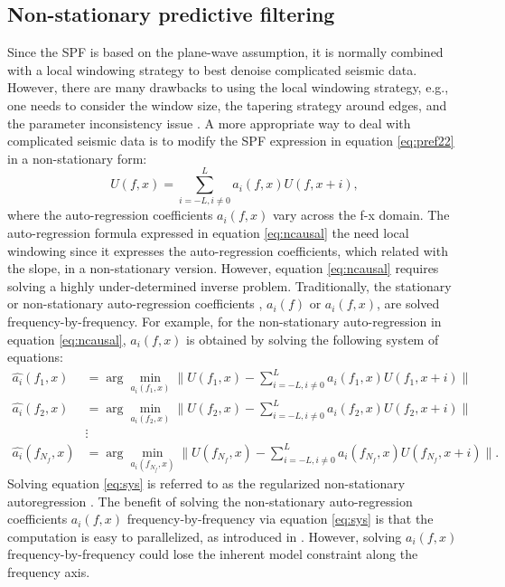 \subsection{Non-stationary predictive filtering}
Since the SPF is based on the plane-wave assumption, it is normally combined with a local windowing strategy to best denoise complicated seismic data. However, there are many drawbacks to using the local windowing strategy, e.g., one needs to consider the window size, the tapering strategy around edges, and the parameter inconsistency issue \cite[]{shaohuan2017gji}. A more appropriate way to deal with complicated seismic data is to modify the SPF expression in equation \ref{eq:pref22} in a non-stationary form:
\begin{equation}
\label{eq:ncausal}
U(f,x)=\sum_{i=-L,i\ne 0}^{L}a_i(f,x)U(f,x+i),
\end{equation}
where the auto-regression coefficients $a_i(f,x)$ vary across the f-x domain. The auto-regression formula expressed in equation \ref{eq:ncausal}  the need  local windowing since it expresses the auto-regression coefficients, which  related with the slope, in a non-stationary version. However, equation \ref{eq:ncausal} requires solving a highly under-determined inverse problem. Traditionally, the stationary \cite[]{canales1984} or non-stationary auto-regression coefficients \cite[]{guochang2012}, $a_i(f)$ or $a_i(f,x)$, are solved frequency-by-frequency. For example, for the non-stationary auto-regression in equation \ref{eq:ncausal}, $a_i(f,x)$ is obtained by solving the following system of equations:
\begin{equation}
\label{eq:sys}
\begin{split}
\hat{a_i}(f_1,x) &= \arg \min_{a_i(f_1,x)} \parallel U(f_1,x)-\sum_{i=-L,i\ne 0}^{L}a_i(f_1,x)U(f_1,x+i) \parallel  \\
\hat{a_i}(f_2,x) &= \arg \min_{a_i(f_2,x)} \parallel U(f_2,x)-\sum_{i=-L,i\ne 0}^{L}a_i(f_2,x)U(f_2,x+i) \parallel  \\
&\vdots\\
\hat{a_i}(f_{N_f},x) &= \arg \min_{a_i(f_{N_f},x)} \parallel U(f_{N_f},x)-\sum_{i=-L,i\ne 0}^{L}a_i(f_{N_f},x)U(f_{N_f},x+i) \parallel.
\end{split}
\end{equation}
Solving equation \ref{eq:sys} is referred to as the regularized non-stationary autoregression \cite[]{guochang2012}. The benefit of solving the non-stationary auto-regression coefficients $a_i(f,x)$ 
frequency-by-frequency via equation \ref{eq:sys} is that the computation is easy to  parallelized, as introduced in \cite{guochang2012}. However, solving $a_i(f,x)$ frequency-by-frequency could lose the inherent model constraint along the frequency axis. 

